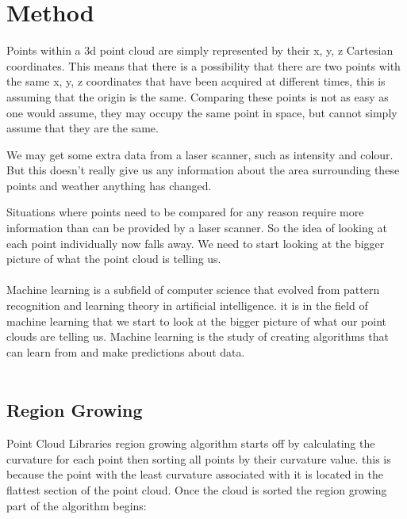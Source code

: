 \chapter{Method}
	
	Points within a 3d point cloud are simply represented by their x, y, z Cartesian coordinates. This means that there is a possibility that there are two points with the same x, y, z coordinates that have been acquired at different times, this is assuming that the origin is the same. Comparing these points is not as easy as one would assume, they may occupy the same point in space, but cannot simply assume that they are the same.
	
	We may get some extra data from a laser scanner, such as intensity and colour. But this doesn't really give us any information about the area surrounding these points and weather anything has changed.
	
	Situations where points need to be compared for any reason require more information than can be provided by a laser scanner. So the idea of looking at each point individually now falls away. We need to start looking at the bigger picture of what the point cloud is telling us.\\
	\\
	Machine learning is a subfield of computer science that evolved from pattern recognition and learning theory in artificial intelligence. it is in the field of machine learning that we start to look at the bigger picture of what our point clouds are telling us. Machine learning is the study of creating algorithms that can learn from and make predictions about data.\\
	\\
	

	
	
	\section{Region Growing}
	Point Cloud Libraries region growing algorithm starts off by calculating the curvature for each point then sorting all points by their curvature value. this is because the point with the least curvature associated with it is located in the flattest section of the point cloud. Once the cloud is sorted the region growing part of the algorithm begins:
	
